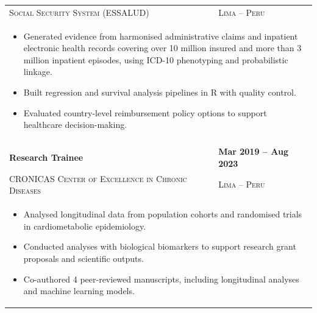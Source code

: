 \begin{longtable}{p{13.4cm}>{\raggedleft\arraybackslash}p{4cm}}
\textsc{Social Security System (ESSALUD)} & \textsc{Lima -- Peru} \\
\multicolumn{2}{p{17.4cm}}{%
\begin{itemize}
  \item Generated evidence from harmonised administrative claims and inpatient electronic health records covering over 10 million insured and more than 3 million inpatient episodes, using \mbox{ICD-10} phenotyping and probabilistic linkage.
  \item Built regression and survival analysis pipelines in R with quality control.
  \item Evaluated country-level reimbursement policy options to support healthcare decision-making.
\end{itemize}
} \\
\\
\textbf{Research Trainee} & \textbf{Mar 2019 -- Aug 2023} \\
\textsc{CRONICAS Center of Excellence in Chronic Diseases} & \textsc{Lima -- Peru} \\
\multicolumn{2}{p{17.4cm}}{%
\begin{itemize}
  \item Analysed longitudinal data from population cohorts and randomised trials in cardiometabolic epidemiology.
  \item Conducted analyses with biological biomarkers to support research grant proposals and scientific outputs.
  \item Co-authored 4 peer-reviewed manuscripts, including longitudinal analyses and machine learning models.
\end{itemize}
} \\
\end{longtable}
